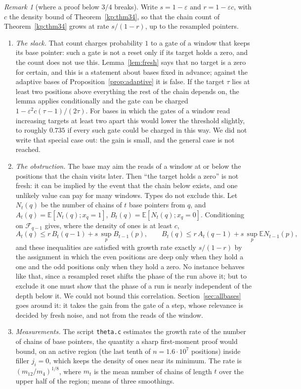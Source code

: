 \documentclass[11pt]{amsart}
\theoremstyle{definition}
\theoremstyle{remark}
\newtheorem{remark}[theorem]{Remark}
\newcommand{\eps}{\varepsilon}
\newcommand{\EE}{\mathbb{E}}
\newcommand{\cF}{\mathcal{F}}
\begin{document}
\begin{remark}[where a proof below $3/4$ breaks]\label{rem:needs}
Write $s=1-\eps$ and $r=1-\eps c$, with $c$ the density bound of Theorem~\ref{kp:thm34}, so that the chain count of
Theorem~\ref{kp:thm34} grows at rate $s/(1-r)$, up to the resampled pointers.
\begin{enumerate}[label=(\roman*),leftmargin=2.4em]
\item \emph{The slack.} That count charges probability $1$ to a gate of a window that keeps its
base pointer: such a gate is not a reset only if its target holds a zero, and the count does not
use this. Lemma~\ref{lem:fresh} says that no target is a zero for certain, and this is a
statement about bases fixed in advance; against the adaptive bases of
Proposition~\ref{prop:adaptive} it is false. If the target $\tau$ lies at least two positions above
everything the rest of the chain depends on, the lemma applies conditionally and the gate can be
charged $1-\eps^2c(\tau-1)/(2\tau)$. For bases in which the gates of a window read increasing
targets at least two apart this would lower the threshold slightly, to roughly $0.735$ if every
such gate could be charged in this way. We did not write that special case out: the gain is
small, and the general case is not reached.
\item \emph{The obstruction.} The base may aim the reads of a window at or below the positions
that the chain visits later. Then ``the target holds a zero'' is not fresh: it can be implied by
the event that the chain below exists, and one unlikely value can pay for many windows. Types do
not exclude this. Let $N_t(q)$ be the number of chains of $t$ base pointers from $q$, and
$A_t(q)=\EE[N_t(q);x_q=1]$, $B_t(q)=\EE[N_t(q);x_q=0]$. Conditioning on $\cF_{q-1}$ gives,
where the density of ones is at least $c$,
\[
A_t(q)\le r\,B_t(q-1)+s\,\sup_p B_{t-1}(p),\qquad
B_t(q)\le r\,A_t(q-1)+s\,\sup_p\EE N_{t-1}(p),
\]
and these inequalities are satisfied with growth rate exactly $s/(1-r)$ by the assignment in
which the even positions are deep only when they hold a one and the odd positions only when they
hold a zero. No instance behaves like that, since a resampled reset shifts the phase of the run
above it; but to exclude it one must show that the phase of a run is nearly independent of the
depth below it. We could not bound this correlation. Section~\ref{sec:allbases} goes around it: it
takes the gain from the gate of a step, whose relevance is decided by fresh noise, and not from
the reads of the window.
\item \emph{Measurements.} The script \texttt{theta.c} estimates the growth rate of the number of
chains of base pointers, the quantity a sharp first-moment proof would bound, on an active region
(the last tenth of $n=1.6\cdot10^7$ positions) inside filler $j_i=0$, which keeps the density of
ones near its minimum. The rate is $(m_{12}/m_4)^{1/8}$, where $m_t$ is the mean number of chains
of length $t$ over the upper half of the region; means of three smoothings.


\end{enumerate}
\end{remark}
\end{document}
